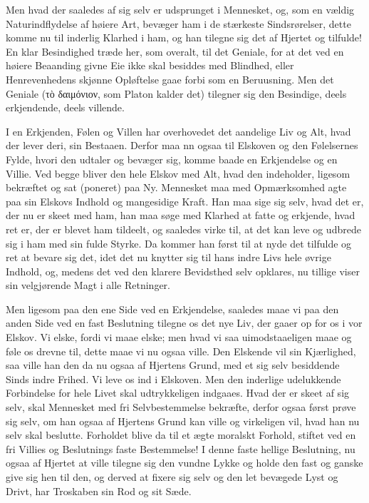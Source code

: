 \documentclass[12pt,a4paper]{book}
\newcommand{\apage}[1]{\marginnote{\footnotesize\textit{[#1]}}}
\begin{document}
Men hvad der saaledes af sig selv er udsprunget i Mennesket, og, som en
vældig Naturindflydelse af høiere Art, bevæger ham i de stærkeste
Sindsrørelser, \apage{59} dette komme nu til inderlig Klarhed i ham, og han tilegne
sig det af Hjertet og tilfulde! En klar Besindighed træde her, som
overalt, til det Geniale, for at det ved en høiere Beaanding givne Eie
ikke skal besiddes med Blindhed, eller Henrevenhedens skjønne Opløftelse
gaae forbi som en Beruusning. Men det Geniale (τὸ δαιμόνιον, som Platon
kalder det) tilegner sig den Besindige, deels erkjendende, deels
villende.

I en Erkjenden, Følen og Villen har overhovedet det aandelige Liv og
Alt, hvad der lever deri, sin Bestaaen. Derfor maa nn ogsaa til Elskoven
og den Følelsernes Fylde, hvori den udtaler og bevæger sig, komme baade
en Erkjendelse og en Villie. Ved begge bliver den hele Elskov med Alt,
hvad den indeholder, ligesom bekræftet og sat (poneret) paa Ny.
Mennesket maa med Opmærksomhed agte paa sin Elskovs Indhold og
mangesidige Kraft. Han maa sige sig selv, hvad det er, der nu er skeet
med ham, han maa søge med Klarhed at fatte og erkjende, hvad ret er, der
er blevet ham tildeelt, og saaledes virke til, at det kan leve og
udbrede sig i ham med sin fulde Styrke. Da kommer han først til at nyde
det tilfulde og ret at bevare sig det, idet det nu knytter sig til hans
indre Livs hele øvrige Indhold, og, medens det ved den klarere
Bevidsthed selv opklares, nu tillige viser sin velgjørende Magt i alle
Retninger.

Men ligesom paa den ene Side ved en Erkjendelse, saaledes maae vi paa
den anden Side ved en fast \apage{60} Beslutning tilegne os det nye Liv, der gaaer
op for os i vor Elskov. Vi elske, fordi vi maae elske; men hvad vi saa
uimodstaaeligen maae og føle os drevne til, dette maae vi nu ogsaa ville.
Den Elskende vil sin Kjærlighed, saa ville han den da nu ogsaa af
Hjertens Grund, med et sig selv besiddende Sinds indre Frihed. Vi leve
os ind i Elskoven. Men den inderlige udelukkende Forbindelse for hele
Livet skal udtrykkeligen indgaaes. Hvad der er skeet af sig selv, skal
Mennesket med fri Selvbestemmelse bekræfte, derfor ogsaa først prøve sig
selv, om han ogsaa af Hjertens Grund kan ville og virkeligen vil, hvad
han nu selv skal beslutte. Forholdet blive da til et ægte moralskt
Forhold, stiftet ved en fri Villies og Beslutnings faste Bestemmelse! I
denne faste hellige Beslutning, nu ogsaa af Hjertet at ville tilegne sig
den vundne Lykke og holde den fast og ganske give sig hen til den, og
derved at fixere sig selv og den let bevægede Lyst og Drivt, har
Troskaben sin Rod og sit Sæde.
\end{document}
